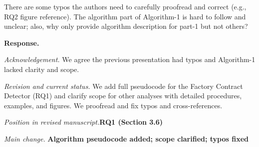\documentclass[acmsmall]{acmart}
\begin{document}
	\begin{tcolorbox}
		[commentbox,title=Reviewer \#4 -- Comment 5] There are some typos the authors need to carefully
		proofread and correct (e.g., RQ2 figure reference). The algorithm part of Algorithm-1 is
		hard to follow and unclear; also, why only provide algorithm description for part-1 but not
		others?
	\end{tcolorbox}

	\noindent
	\textbf{Response.}

	\textit{Acknowledgement.} We agree the previous presentation had typos and Algorithm-1 lacked
	clarity and scope.

	\textit{Revision and current status.} We add full pseudocode for the Factory Contract Detector (RQ1)
	and clarify scope for other analyses with detailed procedures, examples, and figures. We
	proofread and fix typos and cross-references.

	\textit{Position in revised manuscript.}{\color{red}\textbf{RQ1 (Section 3.6)}}

	\textit{Main change.}
	{\color{blue}\textbf{Algorithm pseudocode added; scope clarified; typos fixed}}
\end{document}
